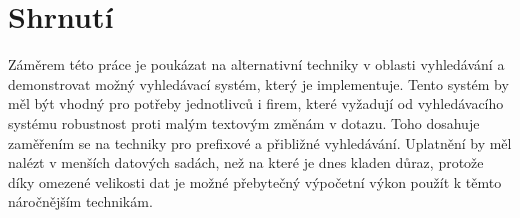 \documentclass[11pt,letterpaper,oneside,openright]{book}
\newcommand{\bftt}[1]{\texttt{\textbf{#1}}}
\begin{document}
%
%


\section{Shrnutí}
Záměrem této práce je poukázat na alternativní techniky v oblasti vyhledávání a
demonstrovat možný vyhledávací systém, který je implementuje. Tento systém by
měl být vhodný pro potřeby jednotlivců i firem, které vyžadují od vyhledávacího
systému robustnost proti malým textovým změnám v dotazu. Toho dosahuje
zaměřením se na techniky pro prefixové a přibližné vyhledávání. Uplatnění by
měl nalézt v menších datových sadách, než na které je dnes kladen důraz,
protože díky omezené velikosti dat je možné přebytečný výpočetní výkon použít k
těmto náročnějším technikám.

\end{document}
